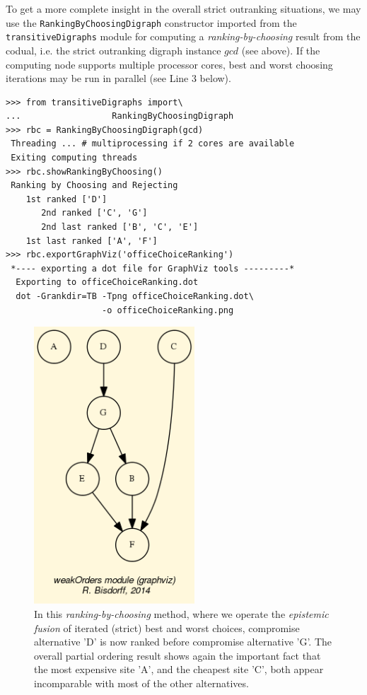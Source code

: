 To get a more complete insight in the overall strict outranking situations, we may use the \texttt{RankingByChoosingDigraph} constructor imported from the \texttt{transitiveDigraphs} module for computing a \emph{ranking-by-choosing} result from the codual, i.e. the strict outranking digraph instance $gcd$ (see above). If the computing node supports multiple processor cores, best and worst choosing iterations may be run in parallel (see Line 3 below).
\begin{lstlisting}
>>> from transitiveDigraphs import\
...                  RankingByChoosingDigraph
>>> rbc = RankingByChoosingDigraph(gcd)
 Threading ... # multiprocessing if 2 cores are available
 Exiting computing threads
>>> rbc.showRankingByChoosing()
 Ranking by Choosing and Rejecting
    1st ranked ['D']
       2nd ranked ['C', 'G']
       2nd last ranked ['B', 'C', 'E']
    1st last ranked ['A', 'F']
>>> rbc.exportGraphViz('officeChoiceRanking')
 *---- exporting a dot file for GraphViz tools ---------*
  Exporting to officeChoiceRanking.dot
  dot -Grankdir=TB -Tpng officeChoiceRanking.dot\
                   -o officeChoiceRanking.png
\end{lstlisting}
\begin{figure}[h]
\sidecaption[t]
\includegraphics[width=6cm]{Figures/officeChoiceRanking.png}
\caption{In this \emph{ranking-by-choosing} method, where we operate the \emph{epistemic fusion} of iterated (strict) best and worst choices, compromise alternative 'D' is now ranked before compromise alternative 'G'. The overall partial ordering result shows again the important fact that the most expensive site 'A', and the cheapest site 'C', both appear incomparable with most of the other alternatives.} 
\label{fig:6.5}       %
\end{figure}
